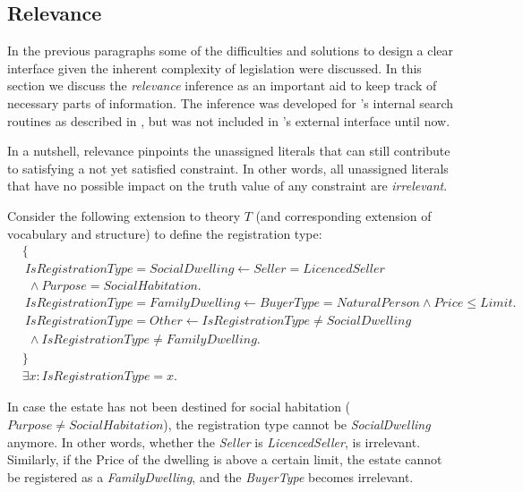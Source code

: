 \subsection{Relevance}
\label{sec:relevance}
In the previous paragraphs some of the difficulties and solutions to design a clear interface given the inherent complexity of legislation were discussed.
In this section we discuss the \emph{relevance} inference as an important aid to keep track of necessary parts of information.
The inference was developed for \idp{}'s internal search routines as described in \cite{Jansen2016}, but was not included in \idp{}'s external interface until now.

In a nutshell, relevance pinpoints the unassigned literals that can still contribute to satisfying a not yet satisfied constraint. In other words, all unassigned literals that have no possible impact on the truth value of any constraint are \emph{irrelevant}.

Consider the following extension to theory $T$ (and corresponding extension of vocabulary and structure) to define the registration type:
\begin{align*}
& \{ \\
& ~ IsRegistrationType = SocialDwelling \leftarrow Seller = LicencedSeller \\ 
& ~~ \wedge Purpose = SocialHabitation.\\
& ~ IsRegistrationType = FamilyDwelling \leftarrow BuyerType = NaturalPerson \wedge Price \leq Limit. \\
& ~ IsRegistrationType = Other \leftarrow IsRegistrationType \neq SocialDwelling \\
& ~~ \wedge IsRegistrationType \neq FamilyDwelling.\\
& \}\\
& \exists x \colon IsRegistrationType = x.
\end{align*}

In case the estate has not been destined for social habitation ($Purpose \neq SocialHabitation$), the registration type cannot be \textit{SocialDwelling} anymore.
In other words, whether the \textit{Seller} is \textit{LicencedSeller}, is irrelevant. 
Similarly, if the Price of the dwelling is above a certain limit, the estate cannot be registered as a \textit{FamilyDwelling}, and the \textit{BuyerType} becomes irrelevant.


